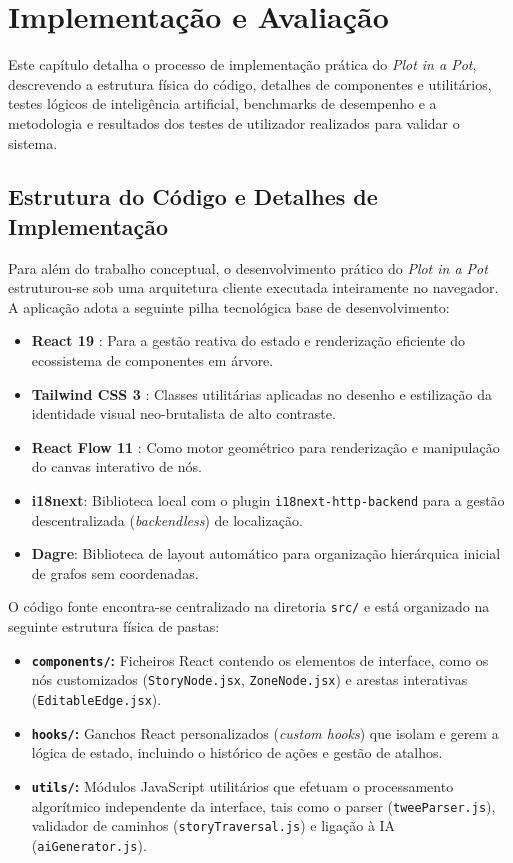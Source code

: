 \chapter{Implementação e Avaliação}
\label{cp:desenvolvimento}

Este capítulo detalha o processo de implementação prática do \textit{Plot in a Pot}, descrevendo a estrutura física do código, detalhes de componentes e utilitários, testes lógicos de inteligência artificial, benchmarks de desempenho e a metodologia e resultados dos testes de utilizador realizados para validar o sistema.

\section{Estrutura do Código e Detalhes de Implementação}
\label{sec:estrutura-codigo-implementacao}

Para além do trabalho conceptual, o desenvolvimento prático do \textit{Plot in a Pot} estruturou-se sob uma arquitetura cliente executada inteiramente no navegador. A aplicação adota a seguinte pilha tecnológica base de desenvolvimento:
\begin{itemize}
    \item \textbf{React 19} \citep{ReactReference}: Para a gestão reativa do estado e renderização eficiente do ecossistema de componentes em árvore.
    \item \textbf{Tailwind CSS 3} \citep{TailwindCSSReference}: Classes utilitárias aplicadas no desenho e estilização da identidade visual neo-brutalista de alto contraste.
    \item \textbf{React Flow 11} \citep{ReactFlowReference}: Como motor geométrico para renderização e manipulação do canvas interativo de nós.
    \item \textbf{i18next}: Biblioteca local com o plugin \texttt{i18next-http-backend} para a gestão descentralizada (\textit{backendless}) de localização.
    \item \textbf{Dagre}: Biblioteca de layout automático para organização hierárquica inicial de grafos sem coordenadas.
\end{itemize}

O código fonte encontra-se centralizado na diretoria \texttt{src/} e está organizado na seguinte estrutura física de pastas:
\begin{itemize}
    \item \textbf{\texttt{components/}:} Ficheiros React contendo os elementos de interface, como os nós customizados (\texttt{StoryNode.jsx}, \texttt{ZoneNode.jsx}) e arestas interativas (\texttt{EditableEdge.jsx}).
    \item \textbf{\texttt{hooks/}:} Ganchos React personalizados (\textit{custom hooks}) que isolam e gerem a lógica de estado, incluindo o histórico de ações e gestão de atalhos.
    \item \textbf{\texttt{utils/}:} Módulos JavaScript utilitários que efetuam o processamento algorítmico independente da interface, tais como o parser (\texttt{tweeParser.js}), validador de caminhos (\texttt{storyTraversal.js}) e ligação à IA (\texttt{aiGenerator.js}).
\end{itemize}


